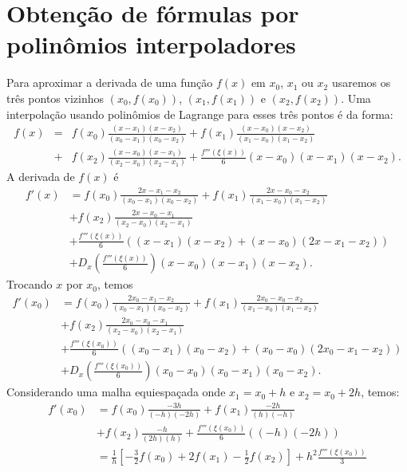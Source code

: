 \section{Obtenção de fórmulas por polinômios interpoladores}

Para aproximar a derivada de uma função $f(x)$ em $x_0$, $x_1$ ou $x_2$ usaremos os três pontos vizinhos $(x_0,f(x_0))$, $(x_{1},f(x_{1}))$ e $(x_{2},f(x_{2}))$. Uma interpolação usando polinômios de Lagrange para esses três pontos é da forma:
\begin{eqnarray*}
f(x)&=&f(x_0)\frac{(x-x_{1})(x-x_{2})}{(x_0-x_{1})(x_0-x_{2})}
+f(x_{1})\frac{(x-x_{0})(x-x_{2})}{(x_{1}-x_{0})(x_{1}-x_{2})}\\
&+&f(x_{2})\frac{(x-x_{0})(x-x_{1})}{(x_{2}-x_{0})(x_{2}-x_{1})} 
+\frac{f'''(\xi(x))}{6}(x-x_0)(x-x_{1})(x-x_{2}).
\end{eqnarray*}
A derivada de $f(x)$ é
\begin{equation}\label{tres_pontos}
  \begin{split}
    f'(x) &= f(x_0)\frac{2x-x_{1}-x_{2}}{(x_0-x_{1})(x_0-x_{2})}
    +f(x_{1})\frac{2x-x_{0}-x_{2}}{(x_{1}-x_{0})(x_{1}-x_{2})}\\
    &+f(x_{2})\frac{2x-x_{0}-x_{1}}{(x_{2}-x_{0})(x_{2}-x_{1})}\\
    &+\frac{f'''(\xi(x))}{6} \left( (x-x_{1})(x-x_{2}) +(x-x_0)(2x-x_{1}-x_{2})\right)\\
    &+ D_x\left(\frac{f'''(\xi(x))}{6}\right)(x-x_0)(x-x_1)(x-x_2).    
  \end{split}
\end{equation}
Trocando $x$ por $x_0$, temos
\begin{equation*}
  \begin{split}
    f'(x_0)&= f(x_0)\frac{2x_0-x_{1}-x_{2}}{(x_0-x_{1})(x_0-x_{2})}
    +f(x_{1})\frac{2x_0-x_{0}-x_{2}}{(x_{1}-x_{0})(x_{1}-x_{2})}\\
    &+f(x_{2})\frac{2x_0-x_{0}-x_{1}}{(x_{2}-x_{0})(x_{2}-x_{1})}\\
    &+ \frac{f'''(\xi(x_0))}{6} \left( (x_0-x_{1})(x_0-x_{2}) +(x_0-x_0)(2x_0-x_{1}-x_{2})\right)\\
    &+ D_x\left(\frac{f'''(\xi(x_0))}{6}\right)(x_0-x_0)(x_0-x_1)(x_0-x_2).
  \end{split}
\end{equation*}
Considerando uma malha equiespaçada onde $x_1=x_0+h$ e $x_2=x_0+2h$, temos:
\begin{equation*}
  \begin{split}
  f'(x_0)&= f(x_0)\frac{-3h}{(-h)(-2h)} + f(x_{1})\frac{-2h}{(h)(-h)} \\
  &+f(x_{2})\frac{-h}{(2h)(h)}+\frac{f'''(\xi(x_0))}{6} \left( (-h)(-2h)\right)\\
  &= \frac{1}{h}\left[-\frac{3}{2}f(x_0)+2f(x_{1})-\frac{1}{2}f(x_{2})\right]+h^2\frac{f'''(\xi(x_0))}{3}    
  \end{split}
\end{equation*}
